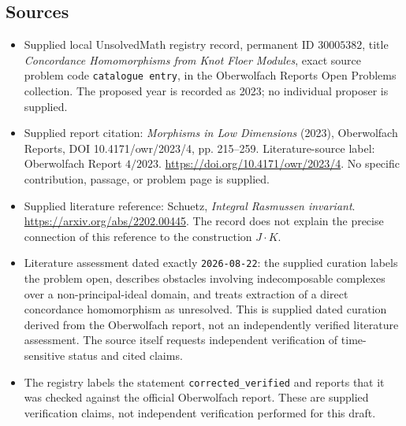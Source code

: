 \documentclass[11pt]{article}
\begin{document}
\subsection{Sources}
\begin{itemize}
\item Supplied local UnsolvedMath registry record, permanent ID \(30005382\), title \emph{Concordance Homomorphisms from Knot Floer Modules}, exact source problem code \texttt{catalogue entry}, in the Oberwolfach Reports Open Problems collection. The proposed year is recorded as 2023; no individual proposer is supplied.
\item Supplied report citation: \emph{Morphisms in Low Dimensions} (2023), Oberwolfach Reports, DOI 10.4171/owr/2023/4, pp. 215--259. Literature-source label: Oberwolfach Report \(4/2023\). \url{https://doi.org/10.4171/owr/2023/4}. No specific contribution, passage, or problem page is supplied.
\item Supplied literature reference: Schuetz, \emph{Integral Rasmussen invariant}. \url{https://arxiv.org/abs/2202.00445}. The record does not explain the precise connection of this reference to the construction \(J\cdot K\).
\item Literature assessment dated exactly \texttt{2026-08-22}: the supplied curation labels the problem open, describes obstacles involving indecomposable complexes over a non-principal-ideal domain, and treats extraction of a direct concordance homomorphism as unresolved. This is supplied dated curation derived from the Oberwolfach report, not an independently verified literature assessment. The source itself requests independent verification of time-sensitive status and cited claims.
\item The registry labels the statement \texttt{corrected\_verified} and reports that it was checked against the official Oberwolfach report. These are supplied verification claims, not independent verification performed for this draft.
\end{itemize}
\end{document}

